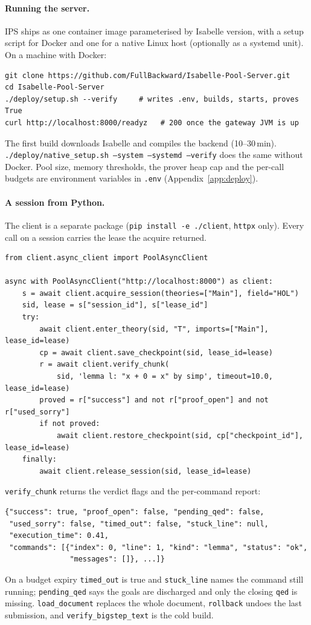 \documentclass[11pt]{article}
\newcommand{\code}[1]{\colorbox{gray!12}{\texttt{\vphantom{Ag}#1}}}
\begin{document}
\paragraph{Running the server.} IPS ships as one container image
parameterised by Isabelle version, with a setup script for Docker and one
for a native Linux host (optionally as a systemd unit). On a machine with
Docker:
\begin{verbatim}
git clone https://github.com/FullBackward/Isabelle-Pool-Server.git
cd Isabelle-Pool-Server
./deploy/setup.sh --verify     # writes .env, builds, starts, proves True
curl http://localhost:8000/readyz   # 200 once the gateway JVM is up
\end{verbatim}
The first build downloads Isabelle and compiles the backend (10--30\,min).
\code{./deploy/native\_setup.sh --system --systemd --verify} does the same
without Docker. Pool size, memory thresholds, the prover heap cap and the
per-call budgets are environment variables in \code{.env}
(Appendix~\ref{app:deploy}).

\paragraph{A session from Python.} The client is a separate package
(\code{pip install -e ./client}, \code{httpx} only). Every call on a session
carries the lease the acquire returned.
\begin{verbatim}
from client.async_client import PoolAsyncClient

async with PoolAsyncClient("http://localhost:8000") as client:
    s = await client.acquire_session(theories=["Main"], field="HOL")
    sid, lease = s["session_id"], s["lease_id"]
    try:
        await client.enter_theory(sid, "T", imports=["Main"], lease_id=lease)
        cp = await client.save_checkpoint(sid, lease_id=lease)
        r = await client.verify_chunk(
            sid, 'lemma l: "x + 0 = x" by simp', timeout=10.0, lease_id=lease)
        proved = r["success"] and not r["proof_open"] and not r["used_sorry"]
        if not proved:
            await client.restore_checkpoint(sid, cp["checkpoint_id"], lease_id=lease)
    finally:
        await client.release_session(sid, lease_id=lease)
\end{verbatim}
\code{verify\_chunk} returns the verdict flags and the per-command
report:
\begin{verbatim}
{"success": true, "proof_open": false, "pending_qed": false,
 "used_sorry": false, "timed_out": false, "stuck_line": null,
 "execution_time": 0.41,
 "commands": [{"index": 0, "line": 1, "kind": "lemma", "status": "ok",
               "messages": []}, ...]}
\end{verbatim}
On a budget expiry \code{timed\_out} is true and \code{stuck\_line}
names the command still running; \code{pending\_qed} says the goals are
discharged and only the closing \code{qed} is missing.
\code{load\_document} replaces the whole document, \code{rollback}
undoes the last submission, and \code{verify\_bigstep\_text} is the
cold build.
\end{document}
